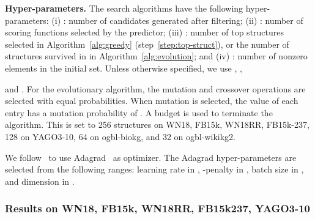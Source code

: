 \documentclass[10pt,journal,compsoc]{IEEEtran}
\newcommand{\parabegin}[1]{\vspace{3px}\noindent\textbf{#1}}
\begin{document}
\begin{figure*}[ht]
	\centering
{}
	\qquad
{}
\qquad
	\qquad
	\qquad
	
	\vspace{-10px}
	\caption{Graphical illustration of the BLMs obtained by 
		AutoBLM (top) and
		AutoBLM+ (bottom) on the KG
		completion task (Section~\ref{exp:kgc:performance}).
		Different colors correspond to 
		different parts of (red), (blue), (yellow), (gray).
		Solid lines mean positive values, while 
		dashed lines mean negative values. 
		The empty parts have value zero.}
	\label{fig:searchedsf}
	\vspace{-10px}
\end{figure*}


\parabegin{Hyper-parameters.}
The search algorithms 
have the following hyper-parameters:
(i) : number of candidates generated after filtering;
(ii) : number of scoring functions selected by the predictor; 
(iii) : number of top structures selected in 
Algorithm~\ref{alg:greedy}
(step~\ref{step:top-struct}),
or the
number of structures survived in  in Algorithm~\ref{alg:evolution};
and
(iv) : number of nonzero elements in the initial set.
Unless otherwise specified,
we use 
, 
, 

and .
For the evolutionary algorithm,
the mutation and crossover operations are selected with
equal probabilities. 
When mutation is selected,
the value of each entry has a mutation probability of .
A budget is used to terminate the algorithm. This is set to 256 structures
on WN18, FB15k, WN18RR, FB15k-237,
128 on YAGO3-10,
64 on ogbl-biokg,
and 32 on ogbl-wikikg2.

We follow~\cite{lacroix2018canonical,trouillon2017knowledge} 
to use Adagrad~\cite{duchi2011adaptive} as optimizer.
The Adagrad
hyper-parameters 
are selected
from the following
ranges:
learning rate
 in , 
-penalty  in ,
batch size  in ,
and dimension  in .


\subsubsection{Results
on WN18, FB15k, WN18RR, FB15k237, YAGO3-10}
\label{exp:kgc:performance}
\end{document}

